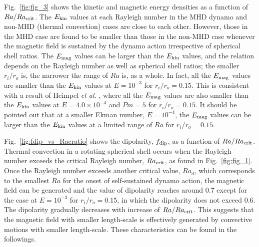 Fig.~\ref{fig:fig_3} shows the kinetic and magnetic energy densities as a function of $Ra / Ra_{\rm crit}$.
The $E_{\rm kin}$ values at each Rayleigh number in the MHD dynamo and non-MHD (thermal convection) cases are close to each other.
However, those in the MHD case are found to be smaller than those in the non-MHD case whenever the magnetic field is sustained by the dynamo action irrespective of spherical shell ratios.
The $E_{\rm mag}$ values can be larger than the $E_{\rm kin}$ values, and the relation depends on the Rayleigh number as well as spherical shell ratios; the smaller $r_i / r_o$ is, the narrower the range of $Ra$ is, as a whole.
In fact, all the $E_{\rm mag}$ values are smaller than the $E_{\rm kin}$ values at $E = 10^{-3}$ for $r_i / r_o = 0.15$.
This is consistent with a result of Heimpel {\it et al.} , where all the $E_{\rm mag}$ values are also smaller than the $E_{\rm kin}$ values at $E = 4.0 \times 10^{-4}$ and $Pm = 5$ for $r_i / r_o = 0.15$.
It should be pointed out that at a smaller Ekman number, $E = 10^{-4}$, the $E_{\rm mag}$ values can be larger than the $E_{\rm kin}$ values at a limited range of $Ra$ for $r_i / r_o = 0.15$.
%

%

Fig.~\ref{fig:fdip_vs_Racratio} shows the dipolarity, $f_{\rm dip}$, as a function of $Ra / Ra_{\rm crit}$.
Thermal convection in a rotating spherical shell occurs when the Rayleigh number exceeds the critical Rayleigh number, $Ra_{\rm crit}$, as found in Fig.~\ref{fig:fig_1}.
Once the Rayleigh number exceeds another critical value, $Ra_d$, which corresponds to the smallest $Ra$ for the onset of self-sustained dynamo action, the magnetic field can be generated and the value of dipolarity reaches around 0.7 except for the case at $E = 10^{-3}$ for $r_i/r_o = 0.15$, in which the dipolarity does not exceed 0.6.
The dipolarity gradually decreases with increase of $Ra / Ra_{\rm crit}$.
This suggests that the magnetic field with smaller length-scale is effectively generated by convective motions with smaller length-scale.
These characteristics can be found in the followings.

% 





